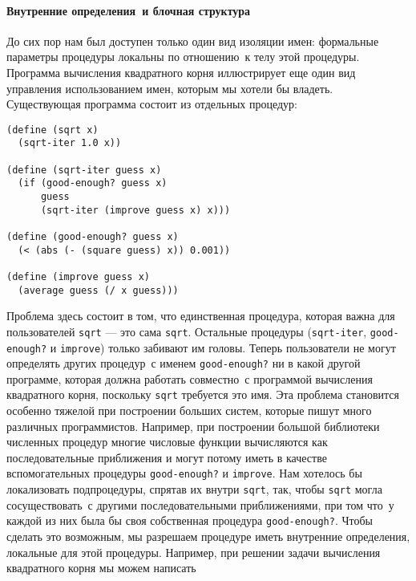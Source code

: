 \paragraph{Внутренние определения~и блочная структура}


До сих пор нам был доступен только один вид изоляции
имен: формальные параметры процедуры локальны по отношению~к телу этой 
процедуры.  Программа вычисления квадратного корня иллюстрирует еще
один вид управления использованием имен, которым мы хотели бы
владеть. 
Существующая программа состоит из отдельных процедур: 

\begin{Verbatim}[fontsize=\small]
(define (sqrt x)
  (sqrt-iter 1.0 x))

(define (sqrt-iter guess x)
  (if (good-enough? guess x)
      guess
      (sqrt-iter (improve guess x) x)))

(define (good-enough? guess x)
  (< (abs (- (square guess) x)) 0.001))

(define (improve guess x)
  (average guess (/ x guess)))
\end{Verbatim}

Проблема здесь состоит в том, что
единственная процедура, которая важна для пользователей
{\tt sqrt} --- это сама {\tt sqrt}.  Остальные процедуры 
({\tt sqrt-iter}, {\tt good-enough?} и
{\tt improve}) только забивают им головы.  Теперь пользователи не могут
определять других процедур~с именем {\tt good-enough?} ни в
какой другой программе, которая должна работать совместно~с программой 
вычисления квадратного корня, поскольку {\tt sqrt} требуется
это имя.  Эта проблема становится особенно тяжелой при построении
больших систем, которые пишут много различных программистов.
Например, при построении большой библиотеки численных процедур многие
числовые функции вычисляются как последовательные приближения и могут
потому иметь в качестве вспомогательных процедуры
{\tt good-enough?} и {\tt improve}. Нам хотелось бы
локализовать подпроцедуры, спрятав их внутри {\tt sqrt}, так,
чтобы {\tt sqrt} могла сосуществовать~с другими
последовательными приближениями, при том что~у каждой из них была бы
своя собственная процедура {\tt good-enough?}.  Чтобы сделать
это возможным, мы разрешаем процедуре иметь 
внутренние определения,
локальные для этой процедуры.  Например, при решении задачи вычисления 
квадратного корня мы можем написать

